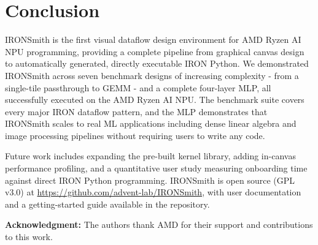 \vspace{-3mm}
\section{Conclusion} \label{sec:conclusion}
\vspace{-3mm}

IRONSmith is the first visual dataflow design environment for AMD Ryzen AI NPU programming, providing a complete pipeline from graphical canvas design to automatically generated, directly executable IRON Python. We demonstrated IRONSmith across seven benchmark designs of increasing complexity - from a single-tile passthrough to GEMM - and a complete four-layer MLP, all successfully executed on the AMD Ryzen AI NPU. The benchmark suite covers every major IRON dataflow pattern, and the MLP demonstrates that IRONSmith scales to real ML applications including dense linear algebra and image processing pipelines without requiring users to write any code.

Future work includes expanding the pre-built kernel library, adding in-canvas performance profiling, and a quantitative user study measuring onboarding time against direct IRON Python programming. IRONSmith is open source (GPL v3.0) at \url{https://github.com/advent-lab/IRONSmith}, with user documentation and a getting-started guide available in the repository. 

\textbf{Acknowledgment:} The authors thank AMD for their support and contributions to this work. 
